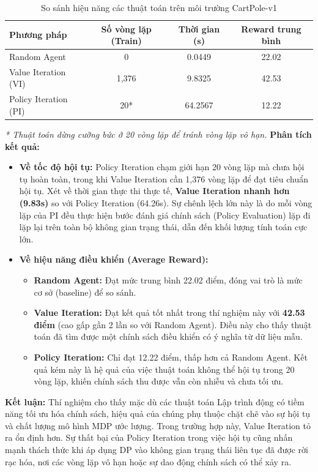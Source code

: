 \begin{table}[H]
\centering
\begin{tabular}{lccc}
\toprule
\textbf{Phương pháp} & \textbf{Số vòng lặp (Train)} & \textbf{Thời gian (s)} & \textbf{Reward trung bình} \\
\midrule
Random Agent & 0 & 0.0449 & 22.02 \\
Value Iteration (VI) & 1,376 & 9.8325 & 42.53 \\
Policy Iteration (PI) & 20* & 64.2567 & 12.22 \\
\bottomrule
\end{tabular}
\caption{So sánh hiệu năng các thuật toán trên môi trường CartPole-v1}
\label{tab:ketqua_final}
\end{table}
\textit{* Thuật toán dừng cưỡng bức ở 20 vòng lặp để tránh vòng lặp vô hạn.}
\textbf{Phân tích kết quả:}
\begin{itemize}
    \item \textbf{Về tốc độ hội tụ:} 
    Policy Iteration chạm giới hạn 20 vòng lặp mà chưa hội tụ hoàn toàn, trong khi Value Iteration cần 1,376 vòng lặp để đạt tiêu chuẩn hội tụ. Xét về thời gian thực thi thực tế, \textbf{Value Iteration nhanh hơn (9.83s)} so với Policy Iteration (64.26s). Sự chênh lệch lớn này là do mỗi vòng lặp của PI đều thực hiện bước đánh giá chính sách (Policy Evaluation) lặp đi lặp lại trên toàn bộ không gian trạng thái, dẫn đến khối lượng tính toán cực lớn.
    
    \item \textbf{Về hiệu năng điều khiển (Average Reward):}
    \begin{itemize}
        \item \textbf{Random Agent:} Đạt mức trung bình 22.02 điểm, đóng vai trò là mức cơ sở (baseline) để so sánh.
        \item \textbf{Value Iteration:} Đạt kết quả tốt nhất trong thí nghiệm này với \textbf{42.53 điểm} (cao gấp gần 2 lần so với Random Agent). Điều này cho thấy thuật toán đã tìm được một chính sách điều khiển có ý nghĩa từ dữ liệu mẫu.
        \item \textbf{Policy Iteration:} Chỉ đạt 12.22 điểm, thấp hơn cả Random Agent. Kết quả kém này là hệ quả của việc thuật toán không thể hội tụ trong 20 vòng lặp, khiến chính sách thu được vẫn còn nhiễu và chưa tối ưu.
    \end{itemize}
\end{itemize}
\textbf{Kết luận:} 
Thí nghiệm cho thấy mặc dù các thuật toán Lập trình động có tiềm năng tối ưu hóa chính sách, hiệu quả của chúng phụ thuộc chặt chẽ vào sự hội tụ và chất lượng mô hình MDP ước lượng. Trong trường hợp này, Value Iteration tỏ ra ổn định hơn. Sự thất bại của Policy Iteration trong việc hội tụ cũng nhấn mạnh thách thức khi áp dụng DP vào không gian trạng thái liên tục đã được rời rạc hóa, nơi các vòng lặp vô hạn hoặc sự dao động chính sách có thể xảy ra.

